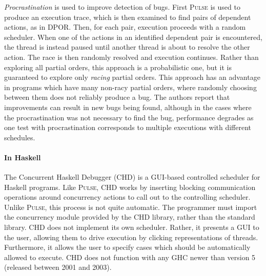\emph{Procrastination}\cite{sen2008} is used to improve detection of
bugs.  First \textsc{Pulse} is used to produce an execution trace,
which is then examined to find pairs of dependent actions, as in DPOR.
Then, for each pair, execution proceeds with a random scheduler.  When
one of the actions in an identified dependent pair is encountered, the
thread is instead paused until another thread is about to resolve the
other action.  The race is then randomly resolved and execution
continues.  Rather than exploring all partial orders, this approach is
a probabilistic one, but it is guaranteed to explore only
\emph{racing} partial orders.  This approach has an advantage in
programs which have many non-racy partial orders, where randomly
choosing between them does not reliably produce a bug.  The authors
report that improvements can result in new bugs being found, although
in the cases where the procrastination was not necessary to find the
bug, performance degrades\cite{arts2011} as one test with
procrastination corresponds to multiple executions with different
schedules.

\paragraph{In Haskell}
The Concurrent Haskell Debugger (CHD)\cite{bottcher2002} is a
GUI-based controlled scheduler for Haskell programs.  Like
\textsc{Pulse}, CHD works by inserting blocking communication
operations around concurrency actions to call out to the controlling
scheduler.  Unlike \textsc{Pulse}, this process is not quite
automatic.  The programmer must import the concurrency module provided
by the CHD library, rather than the standard library.  CHD does not
implement its own scheduler.  Rather, it presents a GUI to the user,
allowing them to drive execution by clicking representations of
threads.  Furthermore, it allows the user to specify cases which
should be automatically allowed to execute.  CHD does not function
with any GHC newer than version 5 (released between 2001 and 2003).
